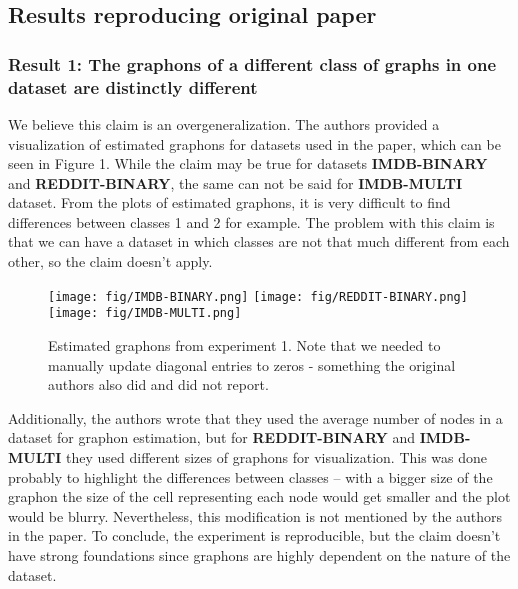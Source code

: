 \subsection{Results reproducing original paper}

\subsubsection{Result 1: The graphons of a different class of graphs in one dataset are distinctly different}

We believe this claim is an overgeneralization. The authors provided a visualization of estimated graphons for datasets used in the paper, which can be seen in Figure 1. While the claim may be true for datasets \textbf{IMDB-BINARY} and \textbf{REDDIT-BINARY}, the same can not be said for \textbf{IMDB-MULTI} dataset. From the plots of estimated graphons, it is very difficult to find differences between classes 1 and 2 for example. The problem with this claim is that we can have a dataset in which classes are not that much different from each other, so the claim doesn't apply. \\

\begin{figure}[!htb]
  \texttt{[image: fig/IMDB-BINARY.png]}
\endminipage\hfill
{}
  \texttt{[image: fig/REDDIT-BINARY.png]}
\endminipage\hfill
{}%
  \texttt{[image: fig/IMDB-MULTI.png]}
\endminipage
	\caption{ Estimated graphons from experiment 1. Note that we needed to manually update diagonal entries to zeros - something the original authors also did and did not report.}
\end{figure}

Additionally, the authors wrote that they used the average number of nodes in a dataset for graphon estimation, but for \textbf{REDDIT-BINARY} and \textbf{IMDB-MULTI} they used different sizes of graphons for visualization. This was done probably to highlight the differences between classes -- with a bigger size of the graphon the size of the cell representing each node would get smaller and the plot would be blurry. Nevertheless, this modification is not mentioned by the authors in the paper. To conclude, the experiment is reproducible, but the claim doesn't have strong foundations since graphons are highly dependent on the nature of the dataset.

